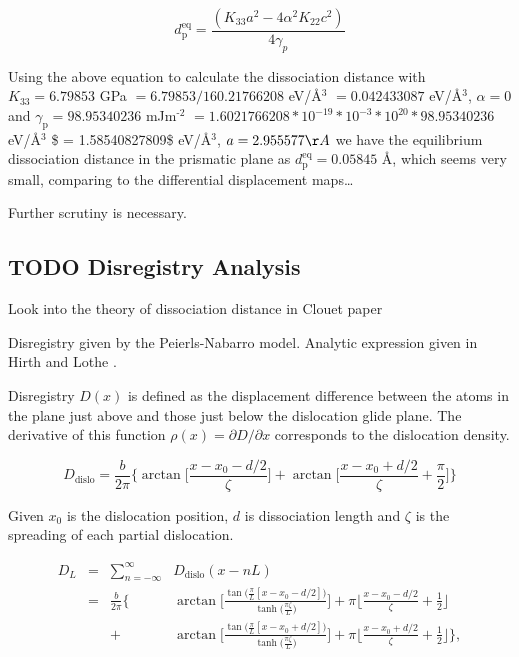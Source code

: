 \documentclass[11pt]{article}
\begin{document}
\[
    d_{\text{p}}^{\text{eq}} = \frac{ ( K_{33}a^2 - 4 \alpha^2 K_{22} c^2 ) }{ 4 \gamma_{p} }
    \]

Using the above equation to calculate the dissociation distance with \(K_{33} = 6.79853\) GPa \(=
    6.79853 / 160.21766208\) eV/\AA{}\(^{\text{3}}\) \(= 0.042433087\) eV/\AA{}\(^{\text{3}}\), \(\alpha = 0\) and \(\gamma_{\text{p}} =
    98.95340236\) mJm\(^{\text{-2}}\) \(= 1.6021766208*10^{-19} * 10^{-3} * 10^{20} * 98.95340236\) eV/\AA{}\(^{\text{3}}\) \$ =
1.58540827809\$ eV/\AA{}\(^{\text{3}}\), \(a = 2.955577 \AA\) we have the equilibrium dissociation distance in the
prismatic plane as \(d_{\text{p}}^{\text{eq}} = 0.05845\) \AA{}, which seems very small, comparing
to the differential displacement maps\ldots{}

Further scrutiny is necessary. 

\subsection{{\bfseries\sffamily TODO} Disregistry Analysis}
\label{sec:org3f47816}
Look into the theory of dissociation distance in Clouet paper
\cite{Clouet2012}


Disregistry given by the Peierls-Nabarro model. Analytic
expression given in Hirth and Lothe \cite{anderson2017theory}.

Disregistry \(D(x)\) is defined as the displacement difference
between the atoms in the plane just above and those just below the
dislocation glide plane. The derivative of this function \(\rho(x) = \partial
    D / \partial x\) corresponds to the dislocation density.


\[
    D_{\text{dislo}} = \frac{b}{2\pi} 
    \Bigg\{ \arctan \bigg[  \frac{x - x_0 - d/2}{ \zeta } \bigg] +
           \arctan \bigg[  \frac{x - x_0 + d/2}{ \zeta } + \frac{\pi}{2} \bigg]
	   \Bigg\}
    \]

Given \(x_0\) is the dislocation position, \(d\) is dissociation
length and \(\zeta\) is the spreading of each partial dislocation. 

\begin{align*}
  D_{L} &= &\sum_{n = -\infty}^{\infty}  &D_{\text{dislo}} (x - nL) \\
     &= &\frac{ b }{ 2\pi } 
        \Bigg \{ 
         &\arctan \bigg[ 
            \frac{ 
                  \tan \big( \frac{\pi}{L} [x - x_0 - d/2] \big)
                 }{ 
                 \tanh \big( \frac{\pi\zeta}{L} \big)
                  } \bigg]
       + \pi\bigg\lfloor 
       	 \frac{x - x_0 - d/2}{ \zeta } + \frac{1}{2}
       \bigg\rfloor \\
   & &+
         &\arctan \bigg[ 
            \frac{ 
                  \tan \big( \frac{\pi}{L} [x - x_0 + d/2] \big)
                 }{ 
                 \tanh \big( \frac{\pi\zeta}{L} \big)
                  } \bigg]
       + \pi \bigg\lfloor 
       	 \frac{x - x_0 + d/2}{ \zeta } + \frac{1}{2}
       \bigg\rfloor    \Bigg\},
\end{align*}
\end{document}
